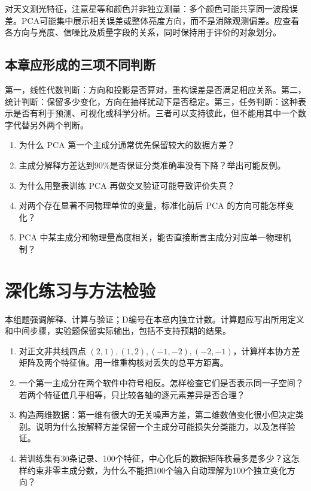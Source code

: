 对天文测光特征，注意星等和颜色并非独立测量：多个颜色可能共享同一波段误差。PCA可能集中展示相关误差或整体亮度方向，而不是消除观测偏差。应查看各方向与亮度、信噪比及质量字段的关系，同时保持用于评价的对象划分。

\subsection{本章应形成的三项不同判断}
第一，线性代数判断：方向和投影是否算对，重构误差是否满足相应关系。第二，统计判断：保留多少变化，方向在抽样扰动下是否稳定。第三，任务判断：这种表示是否有利于预测、可视化或科学分析。三者可以支持彼此，但不能用其中一个数字代替另外两个判断。

\chapterexercise
\begin{enumerate}
\item 为什么 PCA 第一个主成分通常优先保留较大的数据方差？
\item 主成分解释方差达到90\%是否保证分类准确率没有下降？举出可能反例。
\item 为什么用整表训练 PCA 再做交叉验证可能导致评价失真？
\item 对两个存在显著不同物理单位的变量，标准化前后 PCA 的方向可能怎样变化？
\item PCA 中某主成分和物理量高度相关，能否直接断言主成分对应单一物理机制？
\end{enumerate}

\section*{深化练习与方法检验}
本组题强调解释、计算与验证；D编号在本章内独立计数。计算题应写出所用定义和中间步骤，实验题保留实际输出，包括不支持预期的结果。
\begin{enumerate}[label=D\arabic*.]
\item 对正文非共线四点 $(2,1),(1,2),(-1,-2),(-2,-1)$，计算样本协方差矩阵及两个特征值。用一维重构核对丢失的总平方距离。
\item 一个第一主成分在两个软件中符号相反。怎样检查它们是否表示同一子空间？若两个特征值几乎相等，只比较各轴的逐元素差异是否合理？
\item 构造两维数据：第一维有很大的无关噪声方差，第二维数值变化很小但决定类别。说明为什么按解释方差保留一个主成分可能损失分类能力，以及怎样验证。
\item 若训练集有30条记录、100个特征，中心化后的数据矩阵秩最多是多少？这怎样约束非零主成分数，为什么不能把100个输入自动理解为100个独立变化方向？
\end{enumerate}
